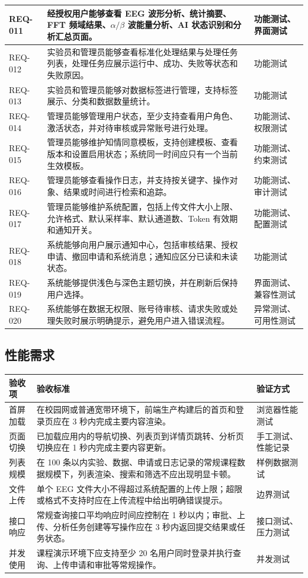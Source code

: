 \begin{longtable}{|p{24mm}|p{88mm}|p{34mm}|}
\hline
REQ-011 & 经授权用户能够查看 EEG 波形分析、统计摘要、FFT 频域结果、$\alpha/\beta$ 波能量分析、AI 状态识别和分析汇总页面。 & 功能测试、界面测试 \\
\hline
REQ-012 & 实验员和管理员能够查看标准化处理结果与处理任务列表，处理任务应展示运行中、成功、失败等状态和失败原因。 & 功能测试 \\
\hline
REQ-013 & 实验员和管理员能够对数据标签进行管理，支持标签展示、分类和数据数量统计。 & 功能测试 \\
\hline
REQ-014 & 管理员能够管理用户状态，至少支持查看用户角色、激活状态，并对待审核或异常账号进行处理。 & 功能测试、权限测试 \\
\hline
REQ-015 & 管理员能够维护知情同意模板，支持创建模板、查看版本和设置启用状态；系统同一时间应只有一个当前生效模板。 & 功能测试、约束测试 \\
\hline
REQ-016 & 管理员能够查看操作日志，并支持按关键字、操作对象、结果或时间进行检索和追踪。 & 功能测试、审计测试 \\
\hline
REQ-017 & 管理员能够维护系统配置，包括上传文件大小上限、允许格式、默认采样率、默认通道数、Token 有效期和通知开关。 & 功能测试、配置测试 \\
\hline
REQ-018 & 系统能够向用户展示通知中心，包括审核结果、授权申请、撤回申请和系统消息；通知应区分已读和未读状态。 & 功能测试 \\
\hline
REQ-019 & 系统能够提供浅色与深色主题切换，并在刷新后保持用户选择。 & 界面测试、兼容性测试 \\
\hline
REQ-020 & 系统能够在数据无权限、账号待审核、请求失败或处理失败时展示明确提示，避免用户进入错误流程。 & 异常测试、可用性测试 \\
\hline
\end{longtable}

\subsection{性能需求}

\begin{longtable}{|p{30mm}|p{82mm}|p{34mm}|}
\hline
\textbf{验收项} & \textbf{验收标准} & \textbf{验证方式} \\
\hline
首屏加载 & 在校园网或普通宽带环境下，前端生产构建后的首页和登录页应在 3 秒内完成主要内容渲染。 & 浏览器性能测试 \\
\hline
页面切换 & 已加载应用内的导航切换、列表页到详情页跳转、分析页切换应在 1 秒内完成主要内容更新。 & 手工测试、性能记录 \\
\hline
列表规模 & 在 100 条以内实验、数据、申请或日志记录的常规课程数据规模下，列表渲染、搜索和筛选不应出现明显卡顿。 & 样例数据测试 \\
\hline
文件上传 & 单个 EEG 文件大小不得超过系统配置的上传上限；超限或格式不支持时应在上传流程中给出明确错误提示。 & 边界测试 \\
\hline
接口响应 & 常规查询接口平均响应时间应控制在 1 秒以内；审批、上传、分析任务创建等写操作应在 3 秒内返回提交结果或任务状态。 & 接口测试、压力测试 \\
\hline
并发使用 & 课程演示环境下应支持至少 20 名用户同时登录并执行查询、上传申请和审批等常规操作。 & 并发测试 \\
\hline
\end{longtable}

